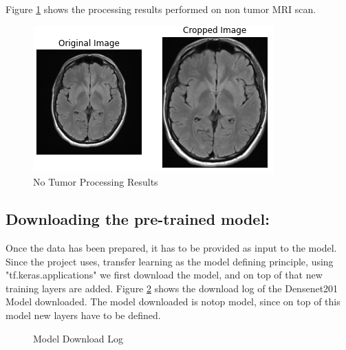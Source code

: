 Figure \ref{fig:no_process} shows the processing results performed on non tumor MRI scan.
\begin{figure}[H]
\includegraphics[scale=1]{Photos/no_process.PNG}
\caption{No Tumor Processing Results} \label{fig:no_process}
\end{figure}

\subsection{Downloading the pre-trained model:}
Once the data has been prepared, it has to be provided as input to the model. Since the project uses, transfer learning as the model defining principle, using "tf.keras.applications" we first download the model, and on top of that new training layers are added. Figure \ref{fig:model_download} shows the download log of the Densenet201 Model downloaded. The model downloaded is notop model, since on top of this model new layers have to be defined.
\begin{figure}[H]
\caption{Model Download Log} \label{fig:model_download}
\end{figure}

